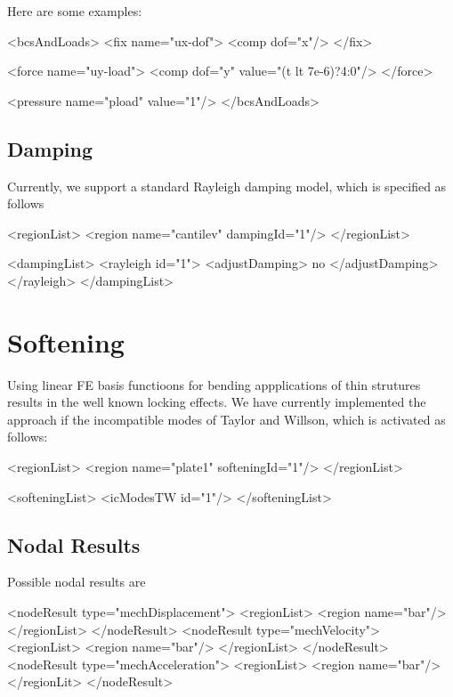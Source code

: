 \bigskip

\noindent
Here are some examples:
\begin{xmllisting}
       <bcsAndLoads>
          <fix name="ux-dof">
            <comp dof="x"/>
          </fix>

          <force name="uy-load">
            <comp dof="y" value="(t  lt 7e-6)?4:0"/>
          </force>

         <pressure name="pload" value="1"/>
        </bcsAndLoads>
\end{xmllisting}

\subsection{Damping}
Currently, we support a standard Rayleigh damping model, which is
specified as follows

\begin{xmllisting}
       <regionList>
          <region name="cantilev" dampingId="1"/>
        </regionList>

        <dampingList>
          <rayleigh id="1">
            <adjustDamping> no </adjustDamping>
            </rayleigh>
        </dampingList>
\end{xmllisting}

\section{Softening}
Using linear FE basis functioons for bending appplications of thin
strutures results in the well known locking effects. We have currently
implemented the approach if the incompatible modes of Taylor and
Willson, which is activated as follows:
\begin{xmllisting}
        <regionList>
          <region name="plate1" softeningId="1"/>
        </regionList>
        
        <softeningList>
          <icModesTW id="1"/>
        </softeningList>
\end{xmllisting}


\subsection{Nodal Results}
Possible nodal results are

\begin{xmllisting}
 <nodeResult type="mechDisplacement">
  <regionList>
   <region name="bar"/>
  </regionList>
 </nodeResult>
 <nodeResult type="mechVelocity">
  <regionList>
   <region name="bar"/>
  </regionList>
 </nodeResult>
 <nodeResult type="mechAcceleration">
  <regionList>
   <region name="bar"/>
  </regionLit>
 </nodeResult>
\end{xmllisting}


